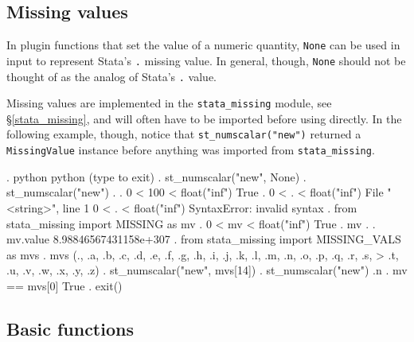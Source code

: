 \documentclass{article}
\begin{document}
\smallskip



\subsection{Missing values} \label{missing_value_example}

In plugin functions that set the value of a numeric quantity, \lstinline$None$ can be used in input to represent Stata's \lstinline$.$ missing value. In general, though, \lstinline$None$ should not be thought of as the analog of Stata's \lstinline{.} value.

Missing values are implemented in the \lstinline$stata_missing$ module, see \S\ref{stata_missing}, and will often have to be imported before using directly. In the following example, though, notice that \lstinline{st_numscalar("new")} returned a \lstinline{MissingValue} instance before anything was imported from \lstinline{stata_missing}.

\smallskip

\begin{stlog}
. python
 python (type {} to exit) 
{\bftt{>>>}}. st_numscalar("new", None)
{\smallskip}
{\bftt{>>>}}. st_numscalar("new")
.
{\smallskip}
{\bftt{>>>}}. 0 < 100 < float("inf")
True
{\smallskip}
{\bftt{>>>}}. 0 < . < float("inf")
{\color{red}  File "<string>", line 1
    0 < . < float("inf")
        {\caret}
SyntaxError: invalid syntax}
{\smallskip}
{\bftt{>>>}}. from stata_missing import MISSING as mv
{\smallskip}
{\bftt{>>>}}. 0 < mv < float("inf")
True
{\smallskip}
{\bftt{>>>}}. mv
.
{\smallskip}
{\bftt{>>>}}. mv.value
8.98846567431158e+307
{\smallskip}
{\bftt{>>>}}. from stata_missing import MISSING_VALS as mvs
{\smallskip}
{\bftt{>>>}}. mvs
(., .a, .b, .c, .d, .e, .f, .g, .h, .i, .j, .k, .l, .m, .n, .o, .p, .q, .r, .s,
>  .t, .u, .v, .w, .x, .y, .z)
{\smallskip}
{\bftt{>>>}}. st_numscalar("new", mvs[14])
{\smallskip}
{\bftt{>>>}}. st_numscalar("new")
.n
{\smallskip}
{\bftt{>>>}}. mv == mvs[0]
True
{\smallskip}
{\bftt{>>>}}. exit()
\end{stlog}

\smallskip


		
\subsection{Basic functions} \label{basic_example}

\smallskip
\end{document}
